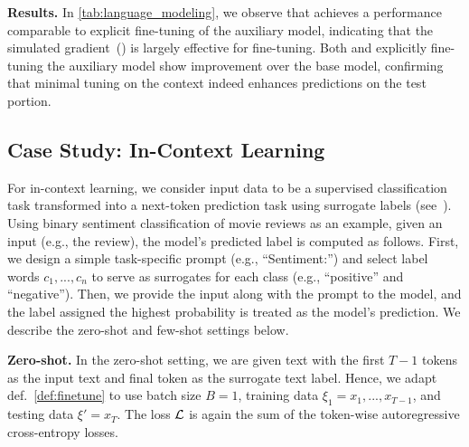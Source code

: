 \textbf{Results.}
In \cref{tab:language_modeling}, we observe that \simulator{} achieves a performance comparable to explicit fine-tuning of the auxiliary model, indicating that the simulated gradient~() is largely effective for fine-tuning. Both \simulator{} and explicitly fine-tuning the auxiliary model show improvement over the base model, confirming that minimal tuning on the context indeed enhances predictions on the test portion. 
\subsection{Case Study: In-Context Learning}
For in-context learning, we consider input data to be a supervised classification task transformed into a next-token prediction task using surrogate labels (see~). Using binary sentiment classification of movie reviews as an example, given an input (e.g., the review), the model's predicted label is computed as follows. First, we design a simple task-specific prompt (e.g., ``Sentiment:'') and select label words $c_1,...,c_n$ to serve as surrogates for each class (e.g., ``positive'' and ``negative''). Then, we provide the input along with the prompt to the model, and the label assigned the highest probability is treated as the model's prediction.  We describe the zero-shot and few-shot settings below.


\textbf{Zero-shot.}
In the zero-shot setting, we are given text with the first $T-1$ tokens as the input text and final token as the surrogate text label. Hence, we adapt def.~\ref{def:finetune} to use batch size $B=1$, training data $\xi_1=x_1,...,x_{T-1}$, and testing data $\xi' = x_T$.
The loss $\mathcal{L}$ is again the sum of the token-wise autoregressive cross-entropy losses. 

